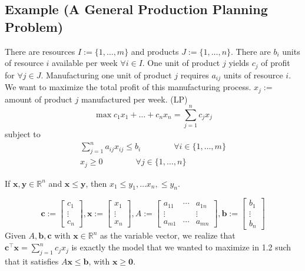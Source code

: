 \subsection{Example (A General Production Planning Problem)}
There are resources $I:=\{1,\dots,m\}$ and products $J:=\{1,\dots,n\}$. 
There are $b_i$ units of resource
$i$ available per week $\forall i\in I$. One unit of product $j$ yields $c_j$ of profit for
$\forall j\in J$. Manufacturing one unit of product $j$ requires $a_{ij}$ units of resource $i$.
We want to maximize the total profit of this manufacturing process.
$x_j :=$ amount of product $j$ manufactured per week. (LP)
\[\max c_1x_1 + \dots + c_nx_n = \sum\limits_{j=1}^n c_jx_j\]
subject to
\begin{align*}
    \sum\limits_{j=1}^n a_{ij}x_{ij}\le b_i \qquad\qquad\forall i\in\{1,\dots,m\}\\
    x_{j}\ge 0 \qquad\qquad\forall j\in\{1,\dots,n\}
\end{align*}

\begin{remark}
    If $\bm{x},\bm{y}\in\mathbb{R}^n$ and $\bm{x}\le \bm{y}$, then
    $x_1\le y_1, \dots x_n, \le y_n$.
\end{remark}

\begin{remark}
\[
\bm{c}:=\left[\begin{array}{c}{c_{1}} \\ {\vdots} \\ {c_{n}}\end{array}\right],
\bm{x}:=\left[\begin{array}{c}{x_{1}} \\ {\vdots} \\ {x_{n}}\end{array}\right],
A:=\left[\begin{array}{cccc}
    {a_{11}} & \cdots & {a_{1 n}} \\
    \vdots & & \vdots \\
     {a_{m 1}} & \cdots & {a_{m n}}
    \end{array}\right],
\bm{b}:=\left[\begin{array}{c}{b_{1}} \\ {\vdots} \\ {b_{n}}\end{array}\right]
\]
Given $A,\bm{b},\bm{c}$ with $\bm{x}\in\mathbb{R}^n$ as the variable vector, we realize that
$\bm{c}^\top  \bm{x}=\sum\limits_{j=1}^n c_jx_j$ is exactly the model that we wanted to maximize
in 1.2 such that it satisfies $A\bm{x}\le \bm{b}$, with $\bm{x}\ge \bm{0}$.
\end{remark}

